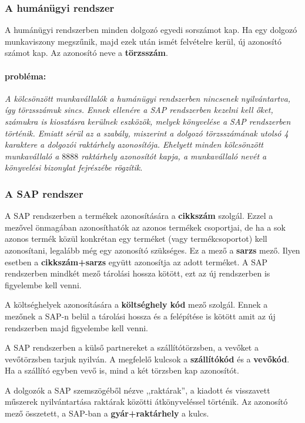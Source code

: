 \documentclass[a4paper,12pt]{report}
\begin{document}
\subsubsection{A humánügyi rendszer}
A humánügyi rendszerben minden dolgozó egyedi sorszámot kap. Ha egy dolgozó 
munkaviszony megszűnik, majd ezek után ismét felvételre kerül, új azonosító 
számot kap. Az azonosító neve a \textbf{törzsszám}.
\paragraph*{probléma:}
\textit{ 
A kölcsönzött munkavállalók a humánügyi rendszerben nincsenek nyilvántartva, 
így törzsszámuk sincs. Ennek ellenére a SAP rendszerben kezelni kell őket, 
számukra is kiosztásra kerülnek eszközök, melyek könyvelése a SAP rendszerben 
történik. Emiatt sérül az a szabály, miszerint a dolgozó törzsszámának utolsó 4 
karaktere a dolgozói raktárhely azonosítója. Ehelyett minden kölcsönzött 
munkavállaló a $8888$ raktárhely azonosítót kapja, a munkavállaló nevét a 
könyvelési bizonylat fejrészébe rögzítik.
}

\subsubsection{A SAP rendszer}
A SAP rendszerben a termékek azonosítására a \textbf{cikkszám} szolgál. Ezzel a
mezővel önmagában azonosíthatók az azonos termékek csoportjai, de ha a sok 
azonos termék közül konkrétan egy terméket (vagy termékcsoportot) kell 
azonosítani, legalább még egy azonosító szükséges. Ez a mező a \textbf{sarzs} 
mező. Ilyen esetben a \textbf{cikkszám+sarzs} együtt azonosítja az adott 
terméket. A SAP rendszerben mindkét mező tárolási hossza kötött, ezt az új 
rendszerben is figyelembe kell venni.


A költséghelyek azonosítására a \textbf{költséghely kód} mező szolgál. Ennek a 
mezőnek a SAP-n belül a tárolási hossza és a felépítése is kötött amit az új 
rendszerben majd figyelembe kell venni.

A SAP rendszerben a külső partnereket a szállítótörzsben, a vevőket a 
vevőtörzsben tarjuk nyilván. A megfelelő kulcsok a \textbf{szállítókód} és a 
\textbf{vevőkód}. Ha a szállító egyben vevő is, mind a két törzsben kap 
azonosítót.

A dolgozók a SAP szemszögéből nézve ,,raktárak'', a kiadott és 
visszavett műszerek nyilvántartása raktárak közötti átkönyveléssel történik. Az 
azonosító mező összetett, a SAP-ban a \textbf{gyár+raktárhely} a kulcs.
\end{document}

